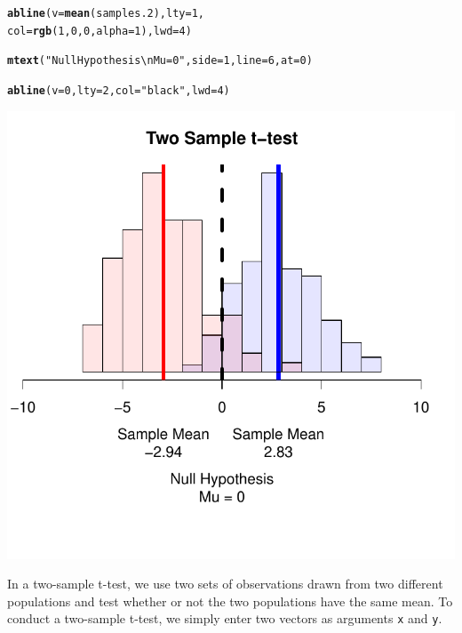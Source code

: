 \documentclass{tufte-book}\usepackage[]{graphicx}\usepackage[]{color}
\makeatletter
\def\maxwidth{ %
  \ifdim\Gin@nat@width>\linewidth
    \linewidth
  \else
    \Gin@nat@width
  \fi
}
\newcommand{\hlnum}[1]{\textcolor[rgb]{0.686,0.059,0.569}{#1}}%
\newcommand{\hlstr}[1]{\textcolor[rgb]{0.192,0.494,0.8}{#1}}%
\newcommand{\hlstd}[1]{\textcolor[rgb]{0.345,0.345,0.345}{#1}}%
\newcommand{\hlkwc}[1]{\textcolor[rgb]{0.333,0.667,0.333}{#1}}%
\newcommand{\hlkwd}[1]{\textcolor[rgb]{0.737,0.353,0.396}{\textbf{#1}}}%
\newenvironment{kframe}{%
 \def\at@end@of@kframe{}%
 \ifinner\ifhmode%
  \def\at@end@of@kframe{\end{minipage}}%
  \begin{minipage}{\columnwidth}%
 \fi\fi%
 \def\FrameCommand##1{\hskip\@totalleftmargin \hskip-\fboxsep
 \colorbox{shadecolor}{##1}\hskip-\fboxsep
     \hskip-\linewidth \hskip-\@totalleftmargin \hskip\columnwidth}%
 \MakeFramed {\advance\hsize-\width
   \@totalleftmargin\z@ \linewidth\hsize
   \@setminipage}}%
 {\par\unskip\endMakeFramed%
 \at@end@of@kframe}
\newenvironment{knitrout}{}{} %
\makeatother
\begin{document}
\begin{footnotesize}
\begin{marginfigure}
\begin{tiny}
\begin{knitrout}
\begin{kframe}
\begin{alltt}
\hlkwd{abline}\hlstd{(}\hlkwc{v} \hlstd{=} \hlkwd{mean}\hlstd{(samples.2),} \hlkwc{lty} \hlstd{=} \hlnum{1}\hlstd{,}
       \hlkwc{col} \hlstd{=} \hlkwd{rgb}\hlstd{(}\hlnum{1}\hlstd{,} \hlnum{0}\hlstd{,} \hlnum{0}\hlstd{,} \hlkwc{alpha} \hlstd{=} \hlnum{1}\hlstd{),} \hlkwc{lwd} \hlstd{=} \hlnum{4}\hlstd{)}

\hlkwd{mtext}\hlstd{(}\hlstr{"Null Hypothesis\textbackslash{}nMu = 0"}\hlstd{,} \hlkwc{side} \hlstd{=} \hlnum{1}\hlstd{,} \hlkwc{line} \hlstd{=} \hlnum{6}\hlstd{,} \hlkwc{at} \hlstd{=}\hlnum{0}\hlstd{)}

\hlkwd{abline}\hlstd{(}\hlkwc{v} \hlstd{=} \hlnum{0}\hlstd{,} \hlkwc{lty} \hlstd{=} \hlnum{2}\hlstd{,} \hlkwc{col} \hlstd{=} \hlstr{"black"}\hlstd{,} \hlkwc{lwd} \hlstd{=} \hlnum{4}\hlstd{)}
\end{alltt}
\end{kframe}
\includegraphics[width=\maxwidth]{figure/unnamed-chunk-227-1} 

\end{knitrout}
\end{tiny}
\end{marginfigure}

In a two-sample t-test, we use two sets of observations drawn from two different populations and test whether or not the two populations have the same mean. To conduct a two-sample t-test, we simply enter two vectors as arguments \texttt{x} and \texttt{y}. 


\end{footnotesize}
\end{document}
